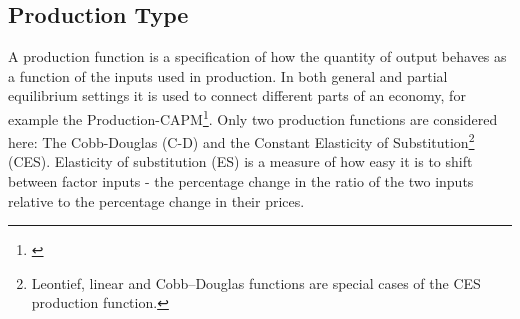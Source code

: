 \documentclass[11pt]{article}
\begin{document}
\subsection{Production Type}
A production function is a specification of how the quantity of output behaves as a function of the inputs used in production.  In both general and partial equilibrium settings it is used to connect different parts of an economy, for example the Production-CAPM\footnote{\cite{cochrane91}}.  Only two production functions are considered here: The Cobb-Douglas (C-D) and the Constant Elasticity of Substitution\footnote{Leontief, linear and Cobb–Douglas functions are special cases of the CES production function.} (CES).  Elasticity of substitution (ES) is a measure of how easy it is to shift between factor inputs - the percentage change in the ratio of the two inputs relative to the percentage change in their prices.

\end{document}
